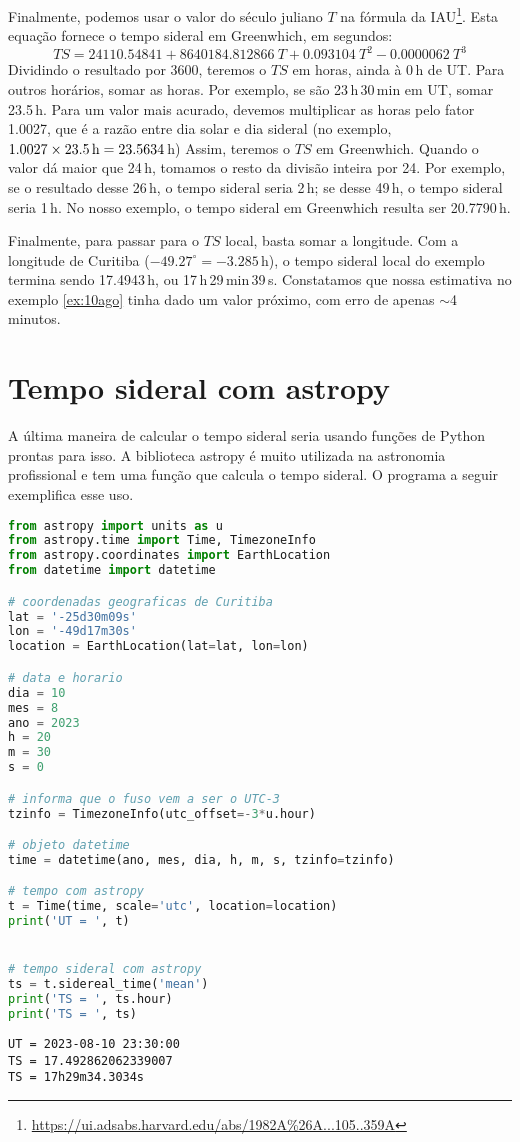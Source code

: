 Finalmente, podemos usar o valor do século juliano $T$ na fórmula da IAU\footnote{\url{https://ui.adsabs.harvard.edu/abs/1982A\%26A...105..359A}}. Esta equação fornece o tempo sideral em Greenwhich, em segundos:
%
\begin{equation}
TS = 24110.54841 + 8640184.812866~T + 0.093104~T^2 - 0.0000062~T^3
\end{equation}
%
Dividindo o resultado por 3600, teremos o $TS$ em horas, ainda à 0\,h de UT. Para outros horários, somar as horas. Por exemplo, se são 23\,h\,30\,min em UT, somar 23.5\,h. Para um valor mais acurado, devemos multiplicar as horas pelo fator 1.0027, que é a razão entre dia solar e dia sideral (no exemplo, $1.0027 \times 23.5\,{\rm h} = 23.5634$\,h) Assim, teremos o $TS$ em Greenwhich. Quando o valor dá maior que 24\,h, tomamos o resto da divisão inteira por 24. Por exemplo, se o resultado desse 26\,h, o tempo sideral seria 2\,h; se desse 49\,h, o tempo sideral seria 1\,h. No nosso exemplo, o tempo sideral em Greenwhich resulta ser 20.7790\,h.

Finalmente, para passar para o $TS$ local, basta somar a longitude. Com a longitude de Curitiba ($-49.27^{\circ} = -3.285$\,h), o tempo sideral local do exemplo termina sendo 17.4943\,h, ou 17\,h\,29\,min\,39\,s. Constatamos que nossa estimativa no exemplo \ref{ex:10ago} tinha dado um valor próximo, com erro de apenas $\sim$4 minutos.

\section{Tempo sideral com astropy}
\label{sec:ts4}

A última maneira de calcular o tempo sideral seria usando funções de Python prontas para isso. A biblioteca astropy é muito utilizada na astronomia profissional e tem uma função que calcula o tempo sideral. O programa a seguir exemplifica esse uso.

\begin{lstlisting}[language=Python]
from astropy import units as u
from astropy.time import Time, TimezoneInfo
from astropy.coordinates import EarthLocation
from datetime import datetime

# coordenadas geograficas de Curitiba
lat = '-25d30m09s'
lon = '-49d17m30s'
location = EarthLocation(lat=lat, lon=lon)

# data e horario
dia = 10
mes = 8
ano = 2023
h = 20
m = 30
s = 0

# informa que o fuso vem a ser o UTC-3
tzinfo = TimezoneInfo(utc_offset=-3*u.hour)

# objeto datetime
time = datetime(ano, mes, dia, h, m, s, tzinfo=tzinfo)

# tempo com astropy
t = Time(time, scale='utc', location=location)
print('UT = ', t)


# tempo sideral com astropy
ts = t.sidereal_time('mean')
print('TS = ', ts.hour)
print('TS = ', ts)

\end{lstlisting}
\noindent\texttt{UT =  2023-08-10 23:30:00}\\
\noindent\texttt{TS =  17.492862062339007}\\
\noindent\texttt{TS =  17h29m34.3034s}\\


